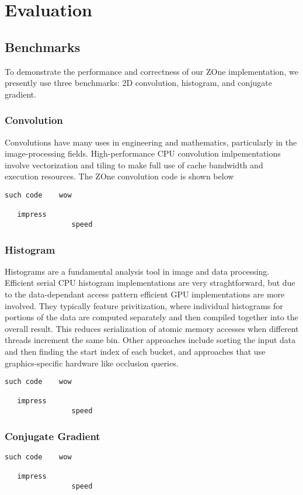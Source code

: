 \section*{Evaluation}

\subsection*{Benchmarks}
To demonstrate the performance and correctness of our ZOne implementation, we
presently use three benchmarks: 2D convolution, histogram, and conjugate
gradient.

\subsubsection*{Convolution}
Convolutions have many uses in engineering and mathematics, particularly in
the image-processing fields. High-performance CPU convolution imlpementations
involve vectorization and tiling to make full use of cache bandwidth and 
execution resources. The ZOne convolution code is shown below

\begin{verbatim}
such code    wow

   impress
                speed
\end{verbatim}


\subsubsection*{Histogram}
Histograms are a fundamental analysis tool in image and data processing.
Efficient serial CPU histogram implementations are very straghtforward, but
due to the data-dependant access pattern efficient GPU implementations are
more involved. They typically feature privitization,
where individual histograms for portions of the data are computed separately
and then compiled together into the overall result. This reduces serialization
of atomic memory accesses when different threads increment the same bin.
Other approaches include sorting the input data and then finding the start
index of each bucket, and approaches that use graphics-specific hardware like
occlusion queries.

\begin{verbatim}
such code    wow

   impress
                speed
\end{verbatim}


\subsubsection*{Conjugate Gradient}

\begin{verbatim}
such code    wow

   impress
                speed
\end{verbatim}

